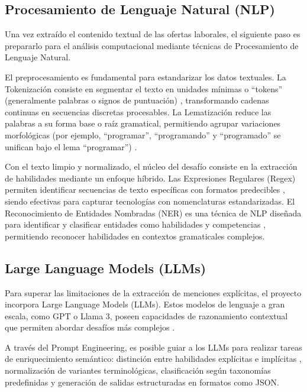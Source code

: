 \subsection{Procesamiento de Lenguaje Natural (NLP)}

Una vez extraído el contenido textual de las ofertas laborales, el siguiente paso es prepararlo para el análisis computacional mediante técnicas de Procesamiento de Lenguaje Natural.

El preprocesamiento es fundamental para estandarizar los datos textuales. La Tokenización consiste en segmentar el texto en unidades mínimas o ``tokens'' (generalmente palabras o signos de puntuación) \cite{nguyen2024}, transformando cadenas continuas en secuencias discretas procesables. La Lematización reduce las palabras a su forma base o raíz gramatical, permitiendo agrupar variaciones morfológicas (por ejemplo, ``programar'', ``programando'' y ``programado'' se unifican bajo el lema ``programar'') \cite{echeverria2022}.

Con el texto limpio y normalizado, el núcleo del desafío consiste en la extracción de habilidades mediante un enfoque híbrido. Las Expresiones Regulares (Regex) permiten identificar secuencias de texto específicas con formatos predecibles \cite{lukauskas2023}, siendo efectivas para capturar tecnologías con nomenclaturas estandarizadas. El Reconocimiento de Entidades Nombradas (NER) es una técnica de NLP diseñada para identificar y clasificar entidades como habilidades y competencias \cite{herandi2024}, permitiendo reconocer habilidades en contextos gramaticales complejos.

\subsection{Large Language Models (LLMs)}

Para superar las limitaciones de la extracción de menciones explícitas, el proyecto incorpora Large Language Models (LLMs). Estos modelos de lenguaje a gran escala, como GPT o Llama 3, poseen capacidades de razonamiento contextual que permiten abordar desafíos más complejos \cite{herandi2024}.

A través del Prompt Engineering, es posible guiar a los LLMs para realizar tareas de enriquecimiento semántico: distinción entre habilidades explícitas e implícitas \cite{nguyen2024}, normalización de variantes terminológicas, clasificación según taxonomías predefinidas y generación de salidas estructuradas en formatos como JSON.


